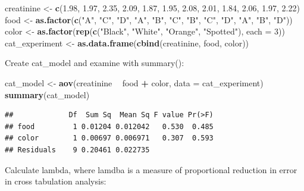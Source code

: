 \documentclass[]{book}
\newenvironment{Shaded}{\begin{snugshade}}{\end{snugshade}}
\newcommand{\DataTypeTok}[1]{\textcolor[rgb]{0.13,0.29,0.53}{#1}}
\newcommand{\DecValTok}[1]{\textcolor[rgb]{0.00,0.00,0.81}{#1}}
\newcommand{\FloatTok}[1]{\textcolor[rgb]{0.00,0.00,0.81}{#1}}
\newcommand{\KeywordTok}[1]{\textcolor[rgb]{0.13,0.29,0.53}{\textbf{#1}}}
\newcommand{\NormalTok}[1]{#1}
\newcommand{\OperatorTok}[1]{\textcolor[rgb]{0.81,0.36,0.00}{\textbf{#1}}}
\newcommand{\StringTok}[1]{\textcolor[rgb]{0.31,0.60,0.02}{#1}}
\begin{document}
\begin{Shaded}
\begin{Highlighting}[]
\NormalTok{creatinine <-}\StringTok{ }\KeywordTok{c}\NormalTok{(}\FloatTok{1.98}\NormalTok{, }\FloatTok{1.97}\NormalTok{, }\FloatTok{2.35}\NormalTok{, }\FloatTok{2.09}\NormalTok{, }\FloatTok{1.87}\NormalTok{, }\FloatTok{1.95}\NormalTok{, }\FloatTok{2.08}\NormalTok{, }\FloatTok{2.01}\NormalTok{, }\FloatTok{1.84}\NormalTok{, }\FloatTok{2.06}\NormalTok{, }\FloatTok{1.97}\NormalTok{, }\FloatTok{2.22}\NormalTok{)}
\NormalTok{food <-}\StringTok{ }\KeywordTok{as.factor}\NormalTok{(}\KeywordTok{c}\NormalTok{(}\StringTok{"A"}\NormalTok{, }\StringTok{"C"}\NormalTok{, }\StringTok{"D"}\NormalTok{, }\StringTok{"A"}\NormalTok{, }\StringTok{"B"}\NormalTok{, }\StringTok{"C"}\NormalTok{, }\StringTok{"B"}\NormalTok{, }\StringTok{"C"}\NormalTok{, }\StringTok{"D"}\NormalTok{, }\StringTok{"A"}\NormalTok{, }\StringTok{"B"}\NormalTok{, }\StringTok{"D"}\NormalTok{))}
\NormalTok{color <-}\StringTok{ }\KeywordTok{as.factor}\NormalTok{(}\KeywordTok{rep}\NormalTok{(}\KeywordTok{c}\NormalTok{(}\StringTok{"Black"}\NormalTok{, }\StringTok{"White"}\NormalTok{, }\StringTok{"Orange"}\NormalTok{, }\StringTok{"Spotted"}\NormalTok{), }\DataTypeTok{each =} \DecValTok{3}\NormalTok{))}
\NormalTok{cat_experiment <-}\StringTok{ }\KeywordTok{as.data.frame}\NormalTok{(}\KeywordTok{cbind}\NormalTok{(creatinine, food, color))}
\end{Highlighting}
\end{Shaded}

Create cat\_model and examine with summary():

\begin{Shaded}
\begin{Highlighting}[]
\NormalTok{cat_model <-}\StringTok{ }\KeywordTok{aov}\NormalTok{(creatinine }\OperatorTok{~}\StringTok{ }\NormalTok{food }\OperatorTok{+}\StringTok{ }\NormalTok{color, }\DataTypeTok{data =}\NormalTok{ cat_experiment)}
\KeywordTok{summary}\NormalTok{(cat_model)}
\end{Highlighting}
\end{Shaded}

\begin{verbatim}
##             Df  Sum Sq  Mean Sq F value Pr(>F)
## food         1 0.01204 0.012042   0.530  0.485
## color        1 0.00697 0.006971   0.307  0.593
## Residuals    9 0.20461 0.022735
\end{verbatim}

Calculate lambda, where lamdba is a measure of proportional reduction in error in cross tabulation analysis:
\end{document}
